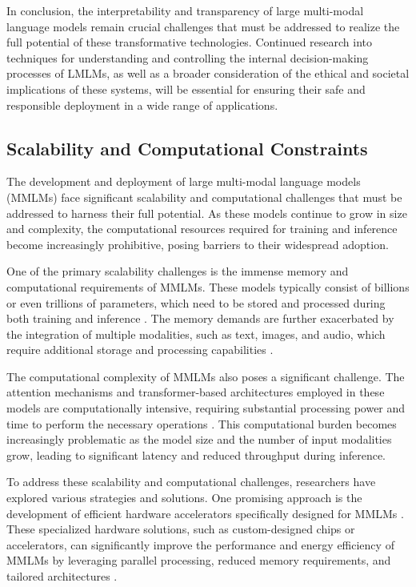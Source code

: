 \documentclass[11pt]{article}
\begin{document}
In conclusion, the interpretability and transparency of large multi-modal language models remain crucial challenges that must be addressed to realize the full potential of these transformative technologies. Continued research into techniques for understanding and controlling the internal decision-making processes of LMLMs, as well as a broader consideration of the ethical and societal implications of these systems, will be essential for ensuring their safe and responsible deployment in a wide range of applications.

\subsection{Scalability and Computational Constraints}

The development and deployment of large multi-modal language models (MMLMs) face significant scalability and computational challenges that must be addressed to harness their full potential. As these models continue to grow in size and complexity, the computational resources required for training and inference become increasingly prohibitive, posing barriers to their widespread adoption.

One of the primary scalability challenges is the immense memory and computational requirements of MMLMs. These models typically consist of billions or even trillions of parameters, which need to be stored and processed during both training and inference \cite{ref335}. The memory demands are further exacerbated by the integration of multiple modalities, such as text, images, and audio, which require additional storage and processing capabilities \cite{ref336}.

The computational complexity of MMLMs also poses a significant challenge. The attention mechanisms and transformer-based architectures employed in these models are computationally intensive, requiring substantial processing power and time to perform the necessary operations \cite{ref337}. This computational burden becomes increasingly problematic as the model size and the number of input modalities grow, leading to significant latency and reduced throughput during inference.

To address these scalability and computational challenges, researchers have explored various strategies and solutions. One promising approach is the development of efficient hardware accelerators specifically designed for MMLMs \cite{ref7}. These specialized hardware solutions, such as custom-designed chips or accelerators, can significantly improve the performance and energy efficiency of MMLMs by leveraging parallel processing, reduced memory requirements, and tailored architectures \cite{ref338}.
\end{document}
